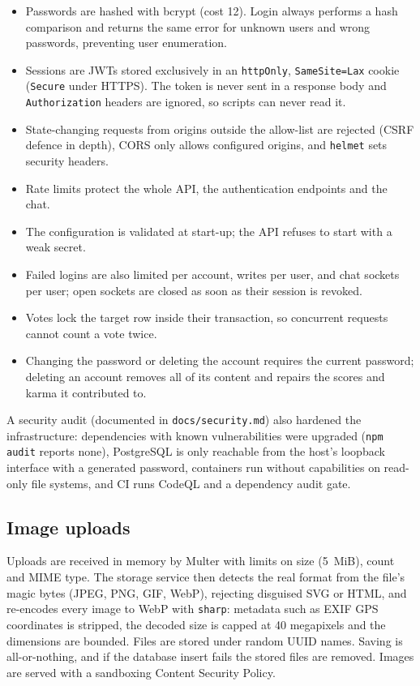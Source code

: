 \documentclass[11pt,a4paper]{article}
\begin{document}
\begin{itemize}
  \item Passwords are hashed with bcrypt (cost 12). Login always performs a hash comparison and returns the same
        error for unknown users and wrong passwords, preventing user enumeration.
  \item Sessions are JWTs stored exclusively in an \texttt{httpOnly}, \texttt{SameSite=Lax} cookie
        (\texttt{Secure} under HTTPS). The token is never sent in a response body and \texttt{Authorization}
        headers are ignored, so scripts can never read it.
  \item State-changing requests from origins outside the allow-list are rejected (CSRF defence in depth), CORS
        only allows configured origins, and \texttt{helmet} sets security headers.
  \item Rate limits protect the whole API, the authentication endpoints and the chat.
  \item The configuration is validated at start-up; the API refuses to start with a weak secret.
  \item Failed logins are also limited per account, writes per user, and chat sockets per user; open
        sockets are closed as soon as their session is revoked.
  \item Votes lock the target row inside their transaction, so concurrent requests cannot count a vote twice.
  \item Changing the password or deleting the account requires the current password; deleting an account
        removes all of its content and repairs the scores and karma it contributed to.
\end{itemize}

A security audit (documented in \texttt{docs/security.md}) also hardened the infrastructure: dependencies with
known vulnerabilities were upgraded (\texttt{npm audit} reports none), PostgreSQL is only reachable from the
host's loopback interface with a generated password, containers run without capabilities on read-only file
systems, and CI runs CodeQL and a dependency audit gate.

\subsection{Image uploads}

Uploads are received in memory by Multer with limits on size (5~MiB), count and MIME type. The storage service
then detects the real format from the file's magic bytes (JPEG, PNG, GIF, WebP), rejecting disguised SVG or HTML,
and re-encodes every image to WebP with \texttt{sharp}: metadata such as EXIF GPS coordinates is stripped, the
decoded size is capped at 40 megapixels and the dimensions are bounded. Files are stored under random UUID names. Saving is all-or-nothing, and if the
database insert fails the stored files are removed. Images are served with a sandboxing Content Security Policy.
\end{document}

